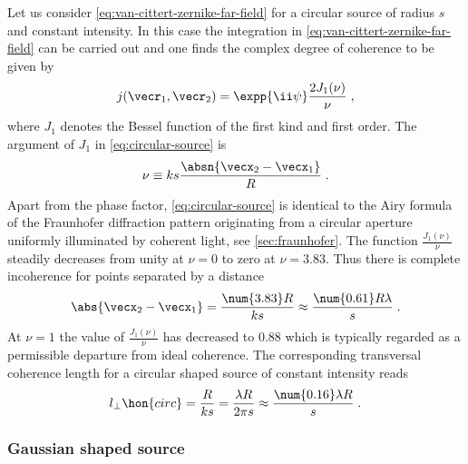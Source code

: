 \documentclass[
twoside,
openright,
titlepage,
numbers=noenddot,
headinclude,
fleqn,
a4paper,
footinclude=true,
cleardoublepage=empty,
abstractoff,
BCOR=5mm,
paper=a4,
fontsize=11pt,
british,ngerman,american,
]{scrreprt}
\begin{document}
Let us consider \cref{eq:van-cittert-zernike-far-field} for a circular
source of radius $s$ and constant intensity.  In this case the
integration in \cref{eq:van-cittert-zernike-far-field} can be carried
out \cite{BornWolf} and one finds the complex degree of coherence to
be given by
\begin{equation}
  \label{eq:circular-source}
  j(\vecr_1,\vecr_2) = \expp{\ii\psi}\frac{2 J_1(\nu)}{\nu} \;,
\end{equation}
where $J_1$ denotes the Bessel function of the first kind and first
order.  The argument of $J_1$ in \cref{eq:circular-source} is
\begin{equation}
  \label{eq:argument-j1}
  \nu \equiv k s\frac{\absn{\vecx_2-\vecx_1}}{R} \;.
\end{equation}
Apart from the phase factor, \cref{eq:circular-source} is identical to
the Airy formula of the Fraunhofer diffraction pattern originating
from a circular aperture uniformly illuminated by coherent light, see
\cref{sec:fraunhofer}.  The function $\frac{J_1(\nu)}{\nu}$ steadily
decreases from unity at $\nu = 0$ to zero at $\nu=\num{3.83}$.  Thus
there is complete incoherence for points separated by a distance
\begin{equation}
  \label{eq:incoherence}
  \abs{\vecx_2-\vecx_1} 
  = \frac{\num{3.83} R}{k s} 
  \approx \frac{\num{0.61} R \lambda}{s} \;.
\end{equation}
At $\nu =1$ the value of $\frac{J_1(\nu)}{\nu}$ has decreased to
\num{0.88} which is typically regarded as a permissible departure from
ideal coherence.  The corresponding transversal coherence length for a
circular shaped source of constant intensity reads
\begin{equation}
  \label{eq:coherence-length-circular}
  l_\perp\hon{circ}
  = \frac{R}{k s} 
  = \frac{\lambda R}{2\pi s} 
  \approx \frac{\num{0.16} \lambda R}{s} \;.
\end{equation}

\subsubsection{Gaussian shaped source}
\label{sec:gaussian-source}
\end{document}
